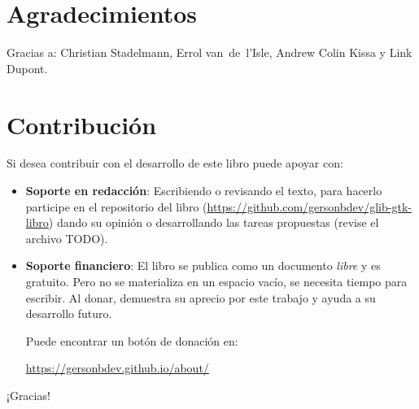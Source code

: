 \section{Agradecimientos}
    Gracias a: Christian Stadelmann, Errol van~de~l'Isle, Andrew Colin Kissa y Link Dupont.

\newpage


\section{Contribución}

    \noindent
    Si desea contribuir con el desarrollo de este libro puede apoyar con:
    
    \begin{itemize}
        \item \textbf{Soporte en redacción}: Escribiendo o revisando el texto, para hacerlo participe en el repositorio del libro (\url{https://github.com/gersonbdev/glib-gtk-libro}) dando su opinión o desarrollando las tareas propuestas (revise el archivo TODO).
        
        \item \textbf{Soporte financiero}: El libro se publica como un documento \emph{libre} y es gratuito. Pero no se materializa en un espacio vacío, se necesita tiempo para escribir. Al donar, demuestra su aprecio por este trabajo y ayuda a su desarrollo futuro.
        
        Puede encontrar un botón de donación en:
    
        \url{https://gersonbdev.github.io/about/}
        
    \end{itemize}
    
    ¡Gracias!
